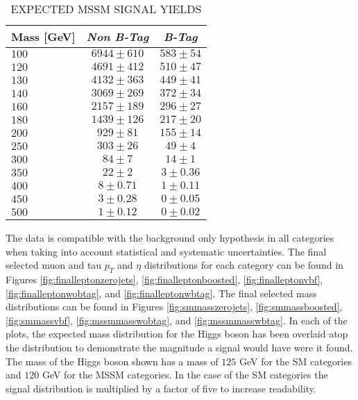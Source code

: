 \begin{table}[htpb]
  \begin{center}
    \caption{EXPECTED MSSM SIGNAL YIELDS}
    \label{tab:mssmsignalyields}
    \begin{tabular}{lcc}
    \toprule
    Mass [GeV]	&	\emph{Non B-Tag}	&	\emph{B-Tag}	\\	
    \midrule
    $100$     	&	$6944 \pm 610$  	&	$583 \pm 54$	\\	
    $120$     	&	$4691 \pm 412$  	&	$510 \pm 47$	\\	
    $130$     	&	$4132 \pm 363$  	&	$449 \pm 41$	\\	
    $140$     	&	$3069 \pm 269$  	&	$372 \pm 34$	\\	
    $160$     	&	$2157 \pm 189$  	&	$296 \pm 27$	\\	
    $180$     	&	$1439 \pm 126$  	&	$217 \pm 20$	\\	
    $200$     	&	$929 \pm 81$    	&	$155 \pm 14$	\\	
    $250$     	&	$303 \pm 26$    	&	$49 \pm 4$  	\\	
    $300$     	&	$84 \pm 7$      	&	$14 \pm 1$  	\\	
    $350$     	&	$22 \pm 2$      	&	$3 \pm 0.36$	\\	
    $400$     	&	$8 \pm 0.71$    	&	$1 \pm 0.11$	\\	
    $450$     	&	$3 \pm 0.28$    	&	$0 \pm 0.05$	\\	
    $500$     	&	$1 \pm 0.12$    	&	$0 \pm 0.02$	\\	
      \bottomrule
    \end{tabular}
  \end{center}
\end{table}

The data is compatible with the background only hypothesis in all categories when taking into account statistical and systematic uncertainties.
The final selected muon and tau $p_{T}$ and $\eta$ distributions for each category can be found in Figures \ref{fig:finalleptonzerojets}, \ref{fig:finalleptonboosted}, \ref{fig:finalleptonvbf}, \ref{fig:finalleptonwobtag}, and \ref{fig:finalleptonwbtag}. 
The final selected mass distributions can be found in Figures \ref{fig:smmasszerojets}, \ref{fig:smmassboosted}, \ref{fig:smmassvbf}, \ref{fig:mssmmasswobtag}, and \ref{fig:mssmmasswbtag}.
In each of the plots, the expected mass distribution for the Higgs boson has been overlaid atop the distribution to demonstrate the magnitude a signal would have were it found.
The mass of the Higgs boson shown has a mass of $125$ GeV for the SM categories and $120$ GeV for the MSSM categories.
In the case of the SM categories the signal distribution is multiplied by a factor of five to increase readability.



